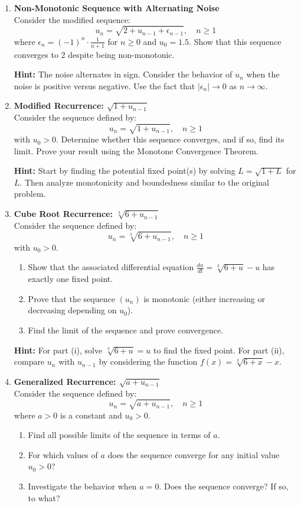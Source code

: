 \documentclass[12pt,a4paper]{article}
\theoremstyle{definition}
\begin{document}
\begin{enumerate}
    \item \textbf{Non-Monotonic Sequence with Alternating Noise}\\
    Consider the modified sequence:
    \[
    u_n = \sqrt{2 + u_{n-1} + \epsilon_{n-1}}, \quad n \geq 1
    \]
    where $\epsilon_n = (-1)^n \cdot \frac{1}{n+1}$ for $n \geq 0$ and $u_0 = 1.5$. Show that this sequence converges to 2 despite being non-monotonic.
    
    \textbf{Hint:} The noise alternates in sign. Consider the behavior of $u_n$ when the noise is positive versus negative. Use the fact that $|\epsilon_n| \to 0$ as $n \to \infty$.
    
    \item \textbf{Modified Recurrence: $\sqrt{1 + u_{n-1}}$}\\
    Consider the sequence defined by:
    \[
    u_n = \sqrt{1 + u_{n-1}}, \quad n \geq 1
    \]
    with $u_0 > 0$. Determine whether this sequence converges, and if so, find its limit. Prove your result using the Monotone Convergence Theorem.
    
    \textbf{Hint:} Start by finding the potential fixed point(s) by solving $L = \sqrt{1 + L}$ for $L$. Then analyze monotonicity and boundedness similar to the original problem.
    
    \item \textbf{Cube Root Recurrence: $\sqrt[3]{6 + u_{n-1}}$}\\
    Consider the sequence defined by:
    \[
    u_n = \sqrt[3]{6 + u_{n-1}}, \quad n \geq 1
    \]
    with $u_0 > 0$.
    \begin{enumerate}[label=\roman*)]
        \item Show that the associated differential equation $\frac{du}{dt} = \sqrt[3]{6 + u} - u$ has exactly one fixed point.
        \item Prove that the sequence $(u_n)$ is monotonic (either increasing or decreasing depending on $u_0$).
        \item Find the limit of the sequence and prove convergence.
    \end{enumerate}
    
    \textbf{Hint:} For part (i), solve $\sqrt[3]{6 + u} = u$ to find the fixed point. For part (ii), compare $u_n$ with $u_{n-1}$ by considering the function $f(x) = \sqrt[3]{6 + x} - x$.
    
    \item \textbf{Generalized Recurrence: $\sqrt{a + u_{n-1}}$}\\
    Consider the sequence defined by:
    \[
    u_n = \sqrt{a + u_{n-1}}, \quad n \geq 1
    \]
    where $a > 0$ is a constant and $u_0 > 0$.
    \begin{enumerate}[label=\roman*)]
        \item Find all possible limits of the sequence in terms of $a$.
        \item For which values of $a$ does the sequence converge for any initial value $u_0 > 0$?
        \item Investigate the behavior when $a = 0$. Does the sequence converge? If so, to what?
    \end{enumerate}
    

\end{enumerate}
\end{document}
